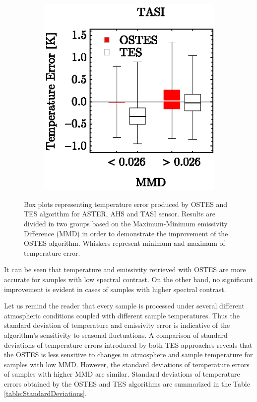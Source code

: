 \begin{figure}[!b]
\begin{subfigure}[t]{.3\linewidth}
		\centering
		\includegraphics[scale=1]{pics/Chapter_04/Simulated_data_TASI.eps}
		\hspace{1cm}\caption{}
	\end{subfigure}
	\vspace{1.5 em}
	\caption{Box plots representing temperature error produced by OSTES and TES algorithm for ASTER, AHS and TASI sensor. Results are divided in two groups based on the Maximum-Minimum emissivity Difference (MMD) in order to demonstrate the improvement of the OSTES algorithm. Whiskers represent minimum and maximum of temperature error.}
	\label{fig:SimualtedDataTemperatureErrorVsLowVsHighMMD}
\end{figure}

It can be seen that temperature and emissivity retrieved with OSTES are more accurate for samples with low spectral contrast. On the other hand, no significant improvement is evident in cases of samples with higher spectral contrast. 

Let us remind the reader that every sample is processed under several different atmospheric conditions coupled with different sample temperatures. Thus the standard deviation of temperature and emissivity error is indicative of the algorithm’s sensitivity to seasonal fluctuations. A comparison of standard deviations of temperature errors introduced by both TES approaches reveals that the OSTES is less sensitive to changes in atmosphere and sample temperature for samples with low MMD. However, the standard deviations of temperature errors of samples with higher MMD are similar. Standard deviations of temperature errors obtained by the OSTES and TES algorithms are summarized in the Table \ref{table:StandardDeviations}.

